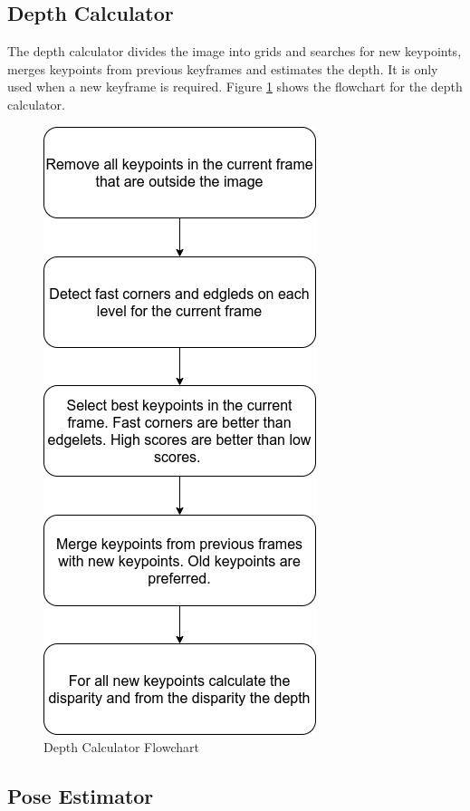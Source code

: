 \documentclass[11pt,a4paper,titlepage,oneside]{report}
\begin{document}
\subsection{Depth Calculator}

The depth calculator divides the image into grids and searches for new keypoints, merges keypoints from previous keyframes and estimates the depth. It is only used when a new keyframe is required. Figure \ref{fig:flow_depth_calculator} shows the flowchart for the depth calculator.

\begin{figure}[H]
  \centering
  \includegraphics[scale=0.3]{img/flow_depth_calculator.png}
  \caption{Depth Calculator Flowchart}\label{fig:flow_depth_calculator}
\end{figure}

\subsection{Pose Estimator}
\end{document}
